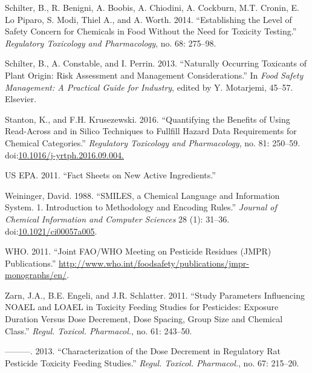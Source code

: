 \documentclass[]{achemso}
\begin{document}
\hypertarget{ref-Schilter2014}{}
Schilter, B., R. Benigni, A. Boobis, A. Chiodini, A. Cockburn, M.T.
Cronin, E. Lo Piparo, S. Modi, Thiel A., and A. Worth. 2014.
``Establishing the Level of Safety Concern for Chemicals in Food Without
the Need for Toxicity Testing.'' \emph{Regulatory Toxicology and
Pharmacology}, no. 68: 275--98.

\hypertarget{ref-Schilter2013}{}
Schilter, B., A. Constable, and I. Perrin. 2013. ``Naturally Occurring
Toxicants of Plant Origin: Risk Assessment and Management
Considerations.'' In \emph{Food Safety Management: A Practical Guide for
Industry}, edited by Y. Motarjemi, 45--57. Elsevier.

\hypertarget{ref-Stanton2016}{}
Stanton, K., and F.H. Krusezewski. 2016. ``Quantifying the Benefits of
Using Read-Across and in Silico Techniques to Fullfill Hazard Data
Requirements for Chemical Categories.'' \emph{Regulatory Toxicology and
Pharmacology}, no. 81: 250--59.
doi:\href{https://doi.org/10.1016/j-yrtph.2016.09.004.}{10.1016/j-yrtph.2016.09.004.}

\hypertarget{ref-EPA2011}{}
US EPA. 2011. ``Fact Sheets on New Active Ingredients.''

\hypertarget{ref-doi:10.1021ux2fci00057a005}{}
Weininger, David. 1988. ``SMILES, a Chemical Language and Information
System. 1. Introduction to Methodology and Encoding Rules.''
\emph{Journal of Chemical Information and Computer Sciences} 28 (1):
31--36.
doi:\href{https://doi.org/10.1021/ci00057a005}{10.1021/ci00057a005}.

\hypertarget{ref-WHO2011}{}
WHO. 2011. ``Joint FAO/WHO Meeting on Pesticide Residues (JMPR)
Publications.''
\url{http://www.who.int/foodsafety/publications/jmpr-monographs/en/}.

\hypertarget{ref-Zarn2011}{}
Zarn, J.A., B.E. Engeli, and J.R. Schlatter. 2011. ``Study Parameters
Influencing NOAEL and LOAEL in Toxicity Feeding Studies for Pesticides:
Exposure Duration Versus Dose Decrement, Dose Spacing, Group Size and
Chemical Class.'' \emph{Regul. Toxicol. Pharmacol.}, no. 61: 243--50.

\hypertarget{ref-Zarn2013}{}
---------. 2013. ``Characterization of the Dose Decrement in Regulatory
Rat Pesticide Toxicity Feeding Studies.'' \emph{Regul. Toxicol.
Pharmacol.}, no. 67: 215--20.
\end{document}
